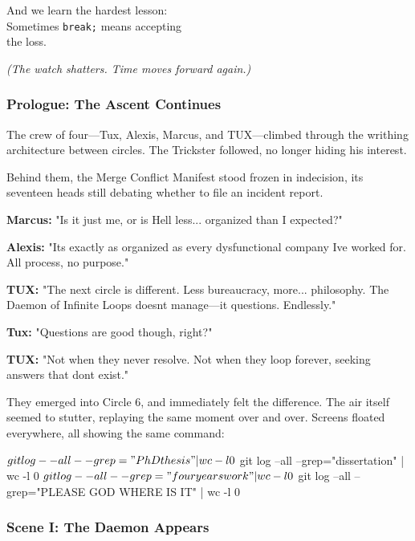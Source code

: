 And we learn the hardest lesson:\\
Sometimes \texttt{break;} means accepting\\
the loss.

\emph{(The watch shatters. Time moves forward again.)}

\bookdivider

\subsubsection{Prologue: The Ascent Continues}\label{prologue-the-ascent-continues}

The crew of four---Tux, Alexis, Marcus, and TUX---climbed through the writhing architecture between circles. The Trickster followed, no longer hiding his interest.

Behind them, the Merge Conflict Manifest stood frozen in indecision, its seventeen heads still debating whether to file an incident report.

\textbf{Marcus:} "Is it just me, or is Hell less... organized than I expected?"

\textbf{Alexis:} "It\textquotesingle s exactly as organized as every dysfunctional company I\textquotesingle ve worked for. All process, no purpose."

\textbf{TUX:} "The next circle is different. Less bureaucracy, more... philosophy. The Daemon of Infinite Loops doesn\textquotesingle t manage---it questions. Endlessly."

\textbf{Tux:} "Questions are good though, right?"

\textbf{TUX:} "Not when they never resolve. Not when they loop forever, seeking answers that don\textquotesingle t exist."

They emerged into Circle 6, and immediately felt the difference. The air itself seemed to stutter, replaying the same moment over and over. Screens floated everywhere, all showing the same command:

\begin{codeblock}
$ git log --all --grep="PhD thesis" | wc -l
0
$ git log --all --grep="dissertation" | wc -l  
0
$ git log --all --grep="four years work" | wc -l
0
$ git log --all --grep="PLEASE GOD WHERE IS IT" | wc -l
0
\end{codeblock}

\bookdivider

\subsubsection{Scene I: The Daemon Appears}\label{scene-i-the-daemon-appears}

